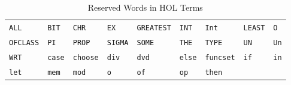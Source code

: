 

\begin{table}[htbp]
\begin{center}
\begin{tabular}{|lllllllll|}
\hline
\texttt{ALL} &
\texttt{BIT} &
\texttt{CHR} &
\texttt{EX} &
\texttt{GREATEST} &
\texttt{INT} &
\texttt{Int} &
\texttt{LEAST} &
\texttt{O} \\
\texttt{OFCLASS} &
\texttt{PI} &
\texttt{PROP} &
\texttt{SIGMA} &
\texttt{SOME} &
\texttt{THE} &
\texttt{TYPE} &
\texttt{UN} &
\texttt{Un} \\
\texttt{WRT} &
\texttt{case} &
\texttt{choose} &
\texttt{div} &
\texttt{dvd} &
\texttt{else} &
\texttt{funcset} &
\texttt{if} &
\texttt{in} \\
\texttt{let} &
\texttt{mem} &
\texttt{mod} &
\texttt{o} &
\texttt{of} &
\texttt{op} &
\texttt{then} &&\\
\hline
\end{tabular}
\end{center}
\caption{Reserved Words in HOL Terms}
\label{tab:ReservedWords}
\end{table}


